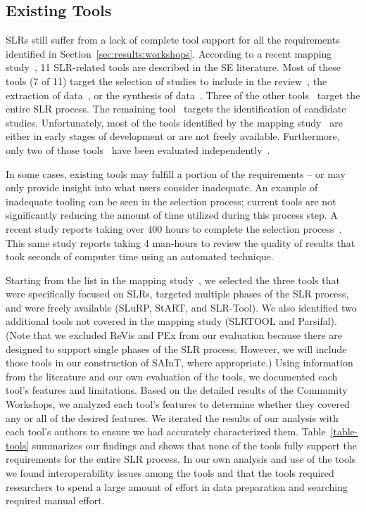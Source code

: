 \subsection{Existing Tools}
\label{sub:existing:tools}

SLRs still suffer from a lack of complete tool support for all the requirements identified in Section~\ref{sec:results:workshops}.
According to a recent mapping study~\cite{Marshall-Brereton:13}, 11 SLR-related tools are described in the SE literature. 
Most of these tools (7 of 11) target the selection of studies to include in the review~\cite{MS:11,MS:13,MS:14,MS:21,MS:22}, the extraction of data~\cite{MS:12,MS:18,MS:21}, or the synthesis of data~\cite{MS:12,MS:16,MS:17,MS:20}.
Three of the other tools~\cite{MS:15,MS:19,MS:23} target the entire SLR process.
The remaining tool~\cite{MS:24} targets the identification of candidate studies.
Unfortunately, most of the tools identified by the mapping study~\cite{Marshall-Brereton:13} are either in early stages of development or are not freely available.
Furthermore, only two of those tools~\cite{MS:18,MS:23} have been evaluated independently~\cite{Marshall-Brereton:13}.

In some cases, existing tools may fulfill a portion of the requirements -- or may only provide insight into what users consider inadequate.  
An example of inadequate tooling can be seen in the selection process; current tools are not significantly reducing the amount of time utilized during this process step.  
A recent study reports taking over 400 hours to complete the selection process~\cite{Hassler:14}. 
This same study reports taking 4 man-hours to review the quality of results that took seconds of computer time using an automated technique.

Starting from the list in the mapping study~\cite{Marshall-Brereton:13}, we selected the three tools that were specifically focused on SLRs, targeted multiple phases of the SLR process, and were freely available (SLuRP, StART, and SLR-Tool).
We also identified two additional tools not covered in the mapping study (SLRTOOL and Parsifal).
(Note that we excluded ReVis and PEx from our evaluation because there are designed to support single phases of the SLR process. However, we will include those tools in our construction of SAInT, where appropriate.)
Using information from the literature and our own evaluation of the tools, we documented each tool's features and limitations.%
Based on the detailed results of the Community Workshops, we analyzed each tool's features to determine whether they covered any or all of the desired features.
We iterated the results of our analysis with each tool's authors to ensure we had accurately characterized them.
Table~\ref{table-tools} summarizes our findings and shows that none of the tools fully support the requirements for the entire SLR process.
In our own analysis and use of the tools we found interoperability issues among the tools and that the tools required researchers to spend a large amount of effort in data preparation and searching required manual effort.


